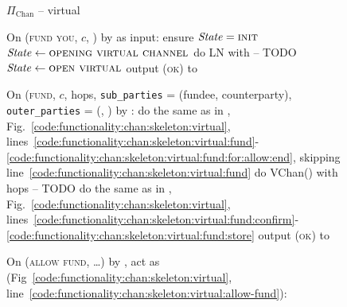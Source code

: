 \begin{figure}[H]
  \begin{protocolbox}{$\Pi_{\mathrm{Chan}}$ -- virtual}
    \begin{algorithmic}[1]
      \State {}
      \State {}
      \State On (\textsc{fund you}, $c$, \bob) by \charlie as input:
      \label{code:protocol:chan:skeleton:vchan:fund-you}
      \Indent
        \State ensure $\mathit{State} = \textsc{init}$
        \State $\mathit{State} \gets \textsc{opening virtual channel}$
        \label{code:protocol:chan:skeleton:vchan:fund-you:state}
        \State do LN with \bob{} -- TODO
        \label{code:protocol:chan:skeleton:vchan:ln}
        \State $\mathit{State} \gets \textsc{open virtual}$
        \State output (\textsc{ok}) to \charlie
        \label{code:protocol:chan:skeleton:vchan:fund-you:output}
      \EndIndent
      \Statex

      \State On (\textsc{fund}, $c$, hops, \texttt{sub\_parties} = (fundee,
      counterparty), \texttt{outer\_parties} = (\charlie, \dave) by
      \environment:
      \Indent
        \State do the same as in \fchan,
        Fig.~\ref{code:functionality:chan:skeleton:virtual},
        lines~\ref{code:functionality:chan:skeleton:virtual:fund}-\ref{code:functionality:chan:skeleton:virtual:fund:for:allow:end},
        skipping line~\ref{code:functionality:chan:skeleton:virtual:fund}
        \State do VChan() with hops -- TODO 
        \label{code:protocol:chan:skeleton:vchan}
        \State do the same as in \fchan,
        Fig.~\ref{code:functionality:chan:skeleton:virtual},
        lines~\ref{code:functionality:chan:skeleton:virtual:fund:confirm}-\ref{code:functionality:chan:skeleton:virtual:fund:store}
        \State output (\textsc{ok}) to \environment
      \EndIndent
      \Statex

      \State {}
      \State On (\textsc{allow fund}, \dots) by \charlie, act as \fchan
      (Fig~\ref{code:functionality:chan:skeleton:virtual},
      line~\ref{code:functionality:chan:skeleton:virtual:allow-fund}):
    \end{algorithmic}
  \end{protocolbox}
  \caption{}
  \label{code:protocol:chan:skeleton:virtual}
\end{figure}

